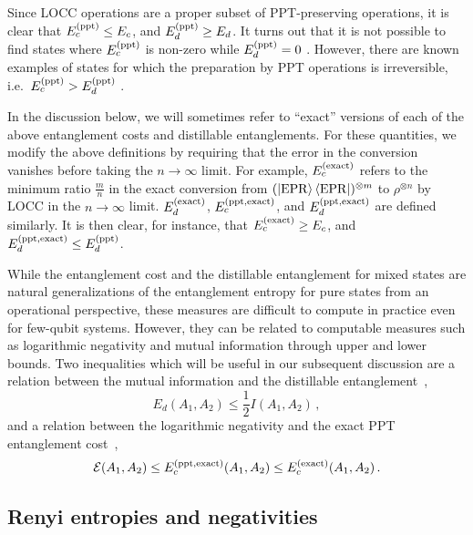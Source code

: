 \documentclass[a4paper,11pt]{article}
\newcommand\half{{\ensuremath{\frac{1}{2}}}}
\newcommand{\be}{\begin{equation}}
\newcommand{\ee}{\end{equation}}
\newcommand\ha{{\half}}
\begin{document}
Since LOCC operations are a proper subset of PPT-preserving operations, it is clear that $E_c^{(\rm ppt)}\leq E_c$, and $E_d^{(\rm ppt)}\geq E_d$. It turns out that 
it is not possible to find states where $E_c^{\rm (ppt)}$ is non-zero while $E_d^{\rm (ppt)}=0$ \cite{2001PhRvL..87y7902E}. However, there are known examples of states for which the preparation by PPT operations is irreversible, i.e.~$E_c^{\rm (ppt)}> E_d^{\rm (ppt)}$ \cite{2017PhRvL.119r0506W}. 

In the discussion below, we will sometimes refer to ``exact'' versions of each of the above entanglement costs and distillable entanglements. For these quantities, we modify the above definitions by requiring that the error in the conversion vanishes before taking the $n\rightarrow \infty$ limit. For example, $E_c^{\rm (exact)}$
refers to the minimum ratio $\frac{m}{n}$ in the exact conversion from $(\ket{\rm EPR}\bra{\rm EPR})^{\otimes m}$ to $\rho^{\otimes n}$ by LOCC in the $n\rightarrow \infty$ limit. $E_d^{\rm (exact)}$, $E_c^{(\rm ppt, exact)}$, and $E_d^{(\rm ppt, exact)}$ are defined similarly. It is then clear, for instance, that $E_c^{\rm (exact)} \geq E_c$, and $E_d^{\rm (ppt, exact)} \leq E_d^{\rm (ppt)}$. 


While the entanglement cost and the distillable entanglement for mixed states are natural generalizations of the entanglement entropy for pure states from an operational perspective, these measures are difficult to compute in practice even for few-qubit systems. However, they can be related to computable measures such as logarithmic negativity and mutual information through upper and lower bounds. Two inequalities which will be useful in our subsequent discussion are a relation between the mutual information and the distillable entanglement~\cite{2004JMP....45..829C}, 
\be 
E_d (A_1, A_2) \leq \ha I (A_1, A_2)\, , 
\ee
and a relation between the logarithmic negativity and the exact PPT entanglement cost~\cite{audenaert2003entanglement}, 
\be 
\mathcal{E} (A_1, A_2) \leq E_c^{\rm (ppt, exact)}(A_1, A_2) \leq E_c^{\rm (exact)}(A_1, A_2) \, . 
\ee

\subsection{Renyi entropies and negativities} \label{sec:revneg}
 
\end{document}

